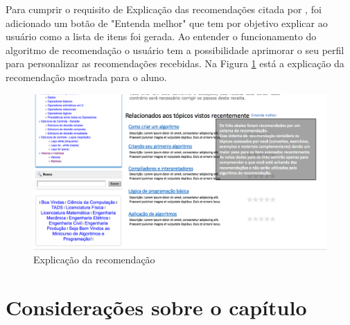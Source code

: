 Para cumprir o requisito de Explicação das recomendações citada por , foi adicionado um
botão de "Entenda melhor" que tem por objetivo explicar ao usuário como a lista de itens foi gerada. Ao entender o
funcionamento do algoritmo de recomendação o usuário tem a possibilidade aprimorar o seu perfil para personalizar as
recomendações recebidas. Na Figura \ref{fig:adaptweb-proposta-explicacao} está a explicação da recomendação mostrada para o aluno.

\begin{figure}[htb]
  \caption{\label{fig:adaptweb-proposta-explicacao}Explicação da recomendação}
  \begin{center}
      \includegraphics[scale=0.6]{./Figuras/explicacoes_v2.png}
  \end{center}
\end{figure}

\section{Considerações sobre o capítulo}
